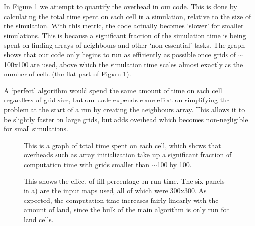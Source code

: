 	 In Figure \ref{overhead} we attempt to quantify the overhead in our code. This is done by calculating the total time spent on each cell in a 
	 simulation, relative to the size of the simulation. With this metric, the code actually becomes `slower' for smaller simulations. This is 
	 because a significant fraction of the simulation time is being spent on finding arrays of neighbours and other `non essential' tasks. The graph
	 shows that our code only begins to run as efficiently as possible once grids of $\sim$100x100 are used, above which the simulation time scales
	 almost exactly as the number of cells (the flat part of Figure \ref{overhead}).\newline{}
	 
	 A `perfect' algorithm would spend the same amount of time on each cell regardless of grid size, but our code expends some effort on simplifying the problem 
	 at the start of a run by creating the neighbours array. This allows it to be slightly faster on large grids, but adds overhead which becomes non-negligible 
	 for small simulations.\newline{}
	 
  \begin{figure}[h]
  \begin{center}
  
  \caption{\label{overhead}This is a graph of total time spent on each cell, which shows that overheads such as array initialization
  take up a significant fraction of computation time with grids smaller than $\sim$100 by 100.}
  \end{center}
  \end{figure}
  
  \begin{figure}[h]
  \begin{center}
  \subfloat[]{}
  \caption{\label{empty}This shows the effect of fill percentage on run time. The six panels in a) are the input maps used, all of which were
  300x300. As expected, the computation time increases fairly linearly with
  the amount of land, since the bulk of the main algorithm is only run for land cells.}
  \end{center}
  \end{figure}
  
  
